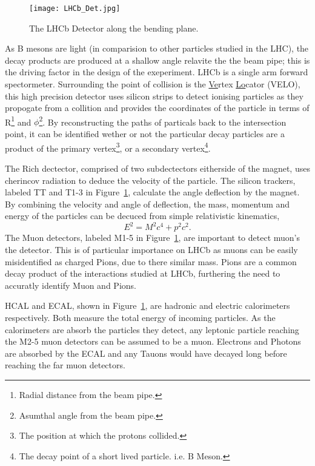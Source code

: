     \begin{figure}[h!]
      \centering
      \texttt{[image: LHCb\_Det.jpg]}
      \caption{The LHCb Detector along the bending plane.}
      \label{fig:LHCb_Collab}
    \end{figure}

    As B mesons are light (in comparision to other particles studied in the LHC), the decay products are produced at a shallow angle relavite the the beam pipe;
    this is the driving factor in the design of the exeperiment. 
    LHCb is a single arm forward spectormeter.
    Surrounding the point of collision is the \underline{Ve}rtex \underline{Lo}cator (VELO), this high precision detector uses silicon strips to detect ionising particles as they propogate from a collition and provides the coordinates of the particle in terms of R\footnote{Radial distance from the beam pipe.} and $\phi$\footnote{Asumthal angle from the beam pipe.}.
    By reconstructing the paths of particals back to the intersection point, it can be identified wether or not the particular decay particles are a product of the primary vertex\footnote{The position at which the protons collided.}, or a secondary vertex\footnote{The decay point of a short lived particle. i.e. B Meson.}.
    \par
    The Rich dectector, comprised of two subdectectors eitherside of the magnet, uses cherincov radiation to deduce the velocity of the particle. The silicon trackers, labeled TT and T1-3 in Figure~\ref{fig:LHCb_Collab}, calculate the angle deflection by the magnet. 
    By combining the velocity and angle of deflection, the mass, momentum and energy of the particles can be decuced from simple relativistic kinematics,
    \begin{equation}
      E^2 = M^2c^4 + p^2c^2.
    \end{equation}
    The Muon detectors, labeled M1-5 in Figure~\ref{fig:LHCb_Collab}, are important to detect muon's the detector. 
    This is of particular importance on LHCb as muons can be easily misidentified as charged Pions, due to there similar mass.
    Pions are a common decay product of the interactions studied at LHCb, furthering the need to accuratly identify Muon and Pions.
    \par
    HCAL and ECAL, shown in Figure~\ref{fig:LHCb_Collab}, are hadronic and electric calorimeters respectively. 
    Both measure the total energy of incoming particles.
    As the calorimeters are absorb the particles they detect, any leptonic particle reaching the M2-5 muon detectors can be assumed to be a muon.
    Electrons and Photons are absorbed by the ECAL and any Tauons would have decayed long before reaching the far muon detectors.

